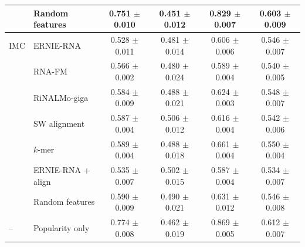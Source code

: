 \begin{table}[t]
{\begin{tabular}{llcccc}
 & Random features & 0.751 $\pm$ 0.010 & 0.451 $\pm$ 0.012 & 0.829 $\pm$ 0.007 & 0.603 $\pm$ 0.009\\
\midrule
IMC & ERNIE-RNA & 0.528 $\pm$ 0.011 & 0.481 $\pm$ 0.014 & 0.606 $\pm$ 0.006 & 0.546 $\pm$ 0.007\\
 & RNA-FM & 0.566 $\pm$ 0.002 & 0.480 $\pm$ 0.024 & 0.589 $\pm$ 0.004 & 0.540 $\pm$ 0.005\\
 & RiNALMo-giga & 0.584 $\pm$ 0.009 & 0.488 $\pm$ 0.021 & 0.624 $\pm$ 0.003 & 0.548 $\pm$ 0.007\\
 & SW alignment & 0.587 $\pm$ 0.004 & 0.506 $\pm$ 0.012 & 0.616 $\pm$ 0.004 & 0.542 $\pm$ 0.006\\
 & $k$-mer & 0.589 $\pm$ 0.004 & 0.488 $\pm$ 0.018 & 0.661 $\pm$ 0.004 & 0.550 $\pm$ 0.004\\
 & ERNIE-RNA + align & 0.535 $\pm$ 0.007 & 0.502 $\pm$ 0.015 & 0.587 $\pm$ 0.004 & 0.534 $\pm$ 0.007\\
 & Random features & 0.590 $\pm$ 0.009 & 0.490 $\pm$ 0.021 & 0.631 $\pm$ 0.012 & 0.546 $\pm$ 0.008\\
\midrule
-- & Popularity only & 0.774 $\pm$ 0.008 & 0.462 $\pm$ 0.019 & 0.869 $\pm$ 0.005 & 0.612 $\pm$ 0.007\\
\bottomrule\end{tabular}}\end{table}